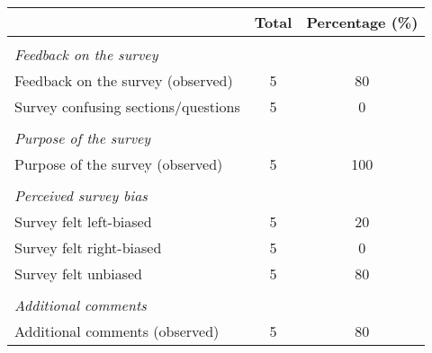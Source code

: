 \begin{tabular}{l*{1}{cc}}
\toprule
                &    Total&Percentage (\%)\\
\midrule
\vspace{0.1em} \\ \emph{Feedback on the survey}&         &         \\
Feedback on the survey (observed)&        5&       80\\
Survey confusing sections/questions&        5&        0\\
\vspace{0.1em} \\ \emph{Purpose of the survey}&         &         \\
Purpose of the survey (observed)&        5&      100\\
\vspace{0.1em} \\ \emph{Perceived survey bias}&         &         \\
Survey felt left-biased&        5&       20\\
Survey felt right-biased&        5&        0\\
Survey felt unbiased&        5&       80\\
\vspace{0.1em} \\ \emph{Additional comments}&         &         \\
Additional comments (observed)&        5&       80\\
\bottomrule
\end{tabular}
